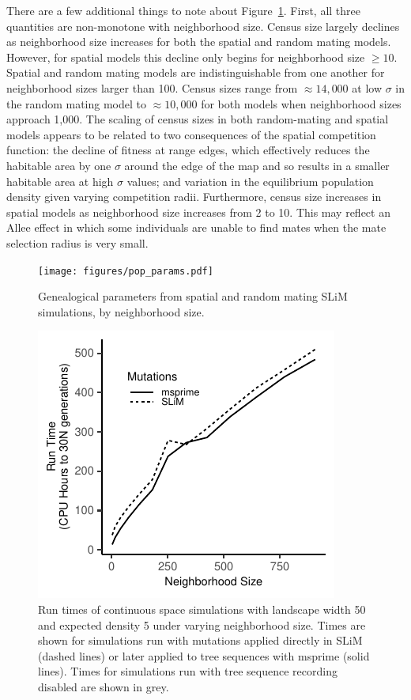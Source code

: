 \documentclass[10pt,twoside,lineno,hidelinks]{preprint}
\begin{document}
There are a few additional things to note about Figure~\ref{fig:genparams}. 
First, all three quantities are non-monotone with neighborhood size. 
Census size largely declines as neighborhood size increases for both the spatial and random mating models. 
However, for spatial models this decline only begins for neighborhood size $\geq 10$. 
Spatial and random mating models are indistinguishable from one another
for neighborhood sizes larger than 100.
Census sizes range from $\approx 14,000$ at low $\sigma$ in the random mating model to $\approx 10,000$ for both models when neighborhood sizes approach 1,000. The scaling of census sizes in both random-mating and spatial models appears to be related to two consequences of the spatial competition function: the decline of fitness at range edges, which effectively reduces the habitable area by one $\sigma$ around the edge of the map and so results in a smaller habitable area at high $\sigma$ values; and variation in the equilibrium population density given varying competition radii.
Furthermore, census size increases in spatial models as neighborhood size increases from 2 to 10.
This may reflect an Allee effect \citep{Allee1949} in which some individuals are unable to find mates when the mate selection radius is very small.  

\begin{figure}[htbp]
\centering
\texttt{[image: figures/pop\_params.pdf]}
\caption{Genealogical parameters from spatial and random mating SLiM simulations, by neighborhood size.}
\label{fig:genparams}
\end{figure}

\begin{figure}[htbp]
\centering
\includegraphics{figures/runtimes.pdf}
\caption{Run times of continuous space simulations with landscape width 50 and expected density 5 under varying neighborhood size. Times are shown for simulations run with mutations applied directly in SLiM (dashed lines) or later applied to tree sequences with msprime (solid lines). Times for simulations run with tree sequence recording disabled are shown in grey.}
\label{fig:runtimes}
\end{figure}
\end{document}
